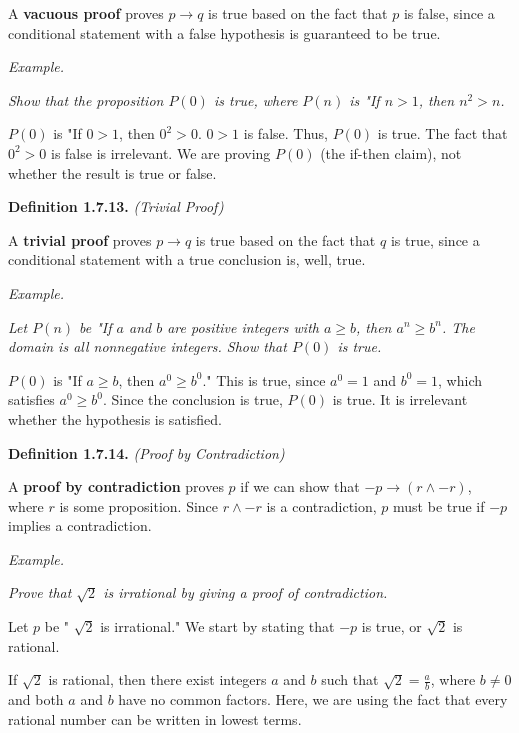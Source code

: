 \documentclass[12pt, letterpaper]{article}
\begin{document}
A \textbf{vacuous proof} proves $ p \rightarrow q $ is true based on the fact that $ p $ is false, since a conditional statement with a false hypothesis is guaranteed to be true.
\bigskip

\textit{Example.}
\medskip

\textit{Show that the proposition $ P(0) $ is true, where $ P(n) $ is "If $ n > 1 $, then $ n^2 > n $.}
\medskip

$ P(0) $ is "If $ 0 > 1 $, then $ 0^2 > 0 $. $ 0 > 1 $ is false. Thus, $ P(0) $ is true. The fact that $ 0^2 > 0 $ is false is irrelevant. We are proving $ P(0) $ (the if-then claim), not whether the result is true or false.

\bigskip
\bigskip

\textbf{Definition 1.7.13.} \textit{(Trivial Proof)}
\medskip

A \textbf{trivial proof} proves $ p \rightarrow q $ is true based on the fact that $ q $ is true, since a conditional statement with a true conclusion is, well, true.
\bigskip

\textit{Example.}
\medskip

\textit{Let $ P(n) $ be "If $ a $ and $ b $ are positive integers with $ a \geq b $, then $ a^n \geq b^n $. The domain is all nonnegative integers. Show that $ P(0) $ is true.}
\medskip

$ P(0) $ is "If $ a \geq b $, then $ a^0 \geq b^0 $." This is true, since $ a^0 = 1$ and $ b^0 = 1 $, which satisfies $ a^0 \geq b^0 $. Since the conclusion is true, $ P(0) $ is true. It is irrelevant whether the hypothesis is satisfied.

\bigskip
\bigskip

\textbf{Definition 1.7.14.} \textit{(Proof by Contradiction)}
\medskip

A \textbf{proof by contradiction} proves $ p $ if we can show that $ -p \rightarrow (r \wedge -r) $, where $ r $ is some proposition. Since $ r \wedge -r $ is a contradiction, $ p $ must be true if $ -p $ implies a contradiction.
\bigskip

\textit{Example.}
\medskip

\textit{Prove that $ \sqrt{2} $ is irrational by giving a proof of contradiction.}
\medskip

Let $ p $ be " $ \sqrt{2} $ is irrational." We start by stating that $ -p $ is true, or $ \sqrt{2} $ is rational.
\medskip

If $ \sqrt{2} $ is rational, then there exist integers $ a $ and $ b $ such that $ \sqrt{2} = \frac{a}{b} $, where $ b \neq 0 $ and both $ a $ and $ b $ have no common factors. Here, we are using the fact that every rational number can be written in lowest terms.
\medskip
\end{document}

